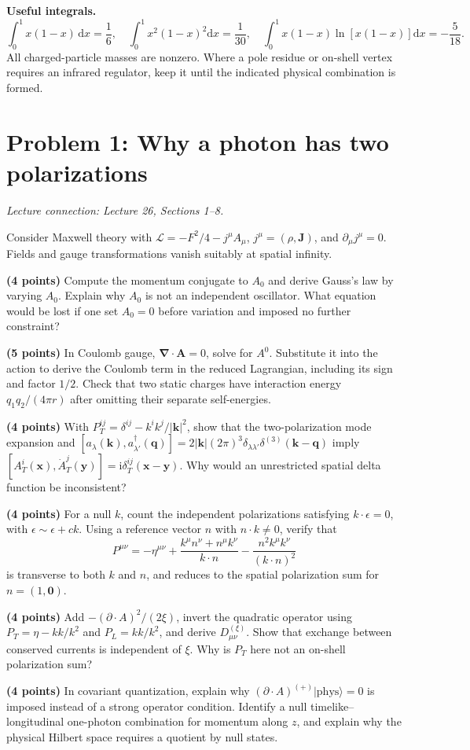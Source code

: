 \documentclass[11pt]{article}
\newcommand{\dd}{\mathrm d}
\newcommand{\ii}{\mathrm i}
\newcommand{\Lag}{\mathcal L}
\newcommand{\problem}[2]{\clearpage\section*{\color{qftblue}Problem #1: #2}}
\newcommand{\connection}[1]{{\small\textit{Lecture connection: #1}\par}\medskip}
\begin{document}
\textbf{Useful integrals.}
\[
 \int_0^1x(1-x)\,\dd x=\frac16,\quad
 \int_0^1x^2(1-x)^2\dd x=\frac1{30},\quad
 \int_0^1x(1-x)\ln[x(1-x)]\dd x=-\frac5{18}.
\]
All charged-particle masses are nonzero. Where a pole residue or on-shell
vertex requires an infrared regulator, keep it until the indicated
physical combination is formed.

\problem{1}{Why a photon has two polarizations}
\connection{Lecture 26, Sections 1--8.}
Consider Maxwell theory with \(\Lag=-F^2/4-j^\mu A_\mu\),
\(j^\mu=(\rho,\bm J)\), and \(\partial_\mu j^\mu=0\). Fields and gauge
transformations vanish suitably at spatial infinity.
\begin{parts}
\item \textbf{(4 points)} Compute the momentum conjugate to \(A_0\) and
derive Gauss's law by varying \(A_0\). Explain why \(A_0\) is not an
independent oscillator. What equation would be lost if one set \(A_0=0\)
before variation and imposed no further constraint?

\item \textbf{(5 points)} In Coulomb gauge,
\(\bm\nabla\cdot\bm A=0\), solve for \(A^0\). Substitute it into the
action to derive the Coulomb term in the reduced Lagrangian, including
its sign and factor \(1/2\). Check that two static charges have interaction
energy \(q_1q_2/(4\pi r)\) after omitting their separate self-energies.

\item \textbf{(4 points)} With
\(P_T^{ij}=\delta^{ij}-k^ik^j/|\bm k|^2\), show that the two-polarization
mode expansion and
\([a_\lambda(\bm k),a_{\lambda'}^\dagger(\bm q)]
=2|\bm k|(2\pi)^3\delta_{\lambda\lambda'}\delta^{(3)}(\bm k-\bm q)\)
imply \([A_T^i(\bm x),\dot A_T^j(\bm y)]=\ii\delta_T^{ij}(\bm x-\bm y)\).
Why would an unrestricted spatial delta function be inconsistent?

\item \textbf{(4 points)} For a null \(k\), count the independent
polarizations satisfying \(k\cdot\epsilon=0\), with
\(\epsilon\sim\epsilon+ck\). Using a reference vector \(n\) with
\(n\cdot k\ne0\), verify that
\[
 P^{\mu\nu}=-\eta^{\mu\nu}
 +\frac{k^\mu n^\nu+n^\mu k^\nu}{k\cdot n}
 -\frac{n^2k^\mu k^\nu}{(k\cdot n)^2}
\]
is transverse to both \(k\) and \(n\), and reduces to the spatial
polarization sum for \(n=(1,\bm0)\).

\item \textbf{(4 points)} Add \(-(\partial\cdot A)^2/(2\xi)\), invert
the quadratic operator using \(P_T=\eta-kk/k^2\) and \(P_L=kk/k^2\),
and derive \(D_{\mu\nu}^{(\xi)}\). Show that exchange between conserved
currents is independent of \(\xi\). Why is \(P_T\) here not an on-shell
polarization sum?

\item \textbf{(4 points)} In covariant quantization, explain why
\((\partial\cdot A)^{(+)}|\mathrm{phys}\rangle=0\) is imposed instead
of a strong operator condition. Identify a null timelike--longitudinal
one-photon combination for momentum along \(z\), and explain why the
physical Hilbert space requires a quotient by null states.
\end{parts}
\end{document}
